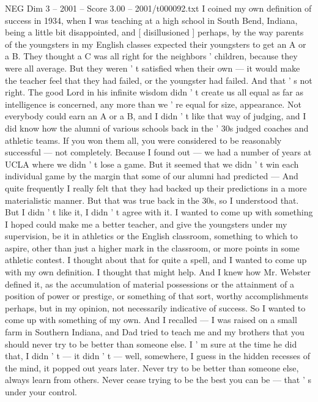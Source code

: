 \begin{textsample}{NEG Dim 3 – 2001 – Score 3.00 – 2001/t000092.txt}  \label{ex:f3_neg_081}
I coined my own definition of success in 1934, when I was teaching at a high school in South Bend, Indiana, being a little bit disappointed, and [ disillusioned ] perhaps, by the way parents of the youngsters in my English classes expected their youngsters to get an A or a B.
They thought a C was all right for the neighbors ' children, because they were all average.
But they weren ' t satisfied when their own — it would make the teacher feel that they had failed, or the youngster had failed.
And that ' s not right.
The good Lord in his infinite wisdom didn ' t create us all equal as far as intelligence is concerned, any more than we ' re equal for size, appearance.
Not everybody could earn an A or a B, and I didn ' t like that way of judging, and I did know how the alumni of various schools back in the ' 30s judged coaches and athletic teams.
If you won them all, you were considered to be reasonably successful — not completely.
Because I found out — we had a number of years at UCLA where we didn ' t lose a game.
But it seemed that we didn ' t win each individual game by the margin that some of our alumni had predicted — And quite frequently I really felt that they had backed up their predictions in a more materialistic manner.
But that was true back in the 30s, so I understood that.
But I didn ' t like it, I didn ' t agree with it.
I wanted to come up with something I hoped could make me a better teacher, and give the youngsters under my supervision, be it in athletics or the English classroom, something to which to aspire, other than just a higher mark in the classroom, or more points in some athletic contest.
I thought about that for quite a spell, and I wanted to come up with my own definition.
I thought that might help.
And I knew how Mr.
Webster defined it, as the accumulation of material possessions or the attainment of a position of power or prestige, or something of that sort, worthy accomplishments perhaps, but in my opinion, not necessarily indicative of success.
So I wanted to come up with something of my own.
And I recalled — I was raised on a small farm in Southern Indiana, and Dad tried to teach me and my brothers that you should never try to be better than someone else.
I ' m sure at the time he did that, I didn ' t — it didn ' t — well, somewhere, I guess in the hidden recesses of the mind, it popped out years later.
Never try to be better than someone else, always learn from others.
Never cease trying to be the best you can be — that ' s under your control.

\end{textsample}
